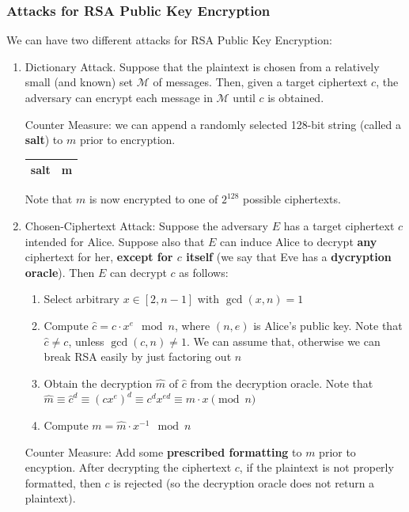 \documentclass[12pt,titlepage]{article}
\begin{document}
\subsubsection{Attacks for RSA Public Key Encryption}
We can have two different attacks for RSA Public Key Encryption: \begin{enumerate}
	\item Dictionary Attack. Suppose that the plaintext is chosen from a relatively small (and known) set $\mathcal{M}$ of messages. Then, given a target ciphertext $c$, the adversary can encrypt each message in $\mathcal{M}$ until $c$ is obtained. 
	
	Counter Measure: we can append a randomly selected 128-bit string (called a \textbf{salt}) to $m$ prior to encryption. $\;\;\;\;\;$
		\begin{tabular}{|c|c|}
		\hline
		salt & m\\
		\hline
		\end{tabular}

	Note that $m$ is now encrypted to one of $2^{128}$ possible ciphertexts. 
	\item Chosen-Ciphertext Attack: Suppose the adversary $E$ has a target ciphertext $c$ intended for Alice. Suppose also that $E$ can induce Alice to decrypt \textbf{any} ciphertext for her, \textbf{except for $c$ itself} (we say that Eve has a \textbf{dycryption oracle}). Then $E$ can decrypt $c$ as follows: \begin{enumerate}
		\item Select arbitrary $x \in [2, n-1]$ with $\gcd(x, n) = 1$
		\item Compute $\hat{c} = c \cdot x^e \mod n$, where $(n,e)$ is Alice's public key. Note that $\hat{c} \neq c$, unless $\gcd(c, n) \neq 1$. We can assume that, otherwise we can break RSA easily by just factoring out $n$
		\item Obtain the decryption $\hat{m}$ of $\hat{c}$ from the decryption oracle. Note that $\hat{m} \equiv \hat{c}^d \equiv (cx^e)^d \equiv c^dx^{ed} \equiv m\cdot x \pmod n$
		\item Compute $m = \hat{m} \cdot x^{-1} \mod n$
	\end{enumerate}

	Counter Measure: Add some \textbf{prescribed formatting} to $m$ prior to encyption. After decrypting the ciphertext $c$, if the plaintext is not properly formatted, then $c$ is rejected (so the decryption oracle does not return a plaintext).
\end{enumerate}
\end{document}
